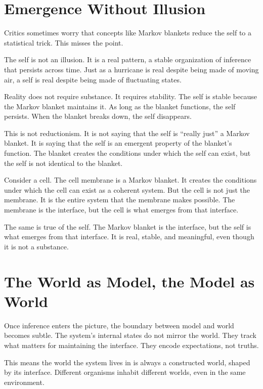 \documentclass[
  openright]{book}
\begin{document}
\section{Emergence Without Illusion}\label{emergence-without-illusion}

Critics sometimes worry that concepts like Markov blankets reduce the
self to a statistical trick. This misses the point.

The self is not an illusion. It is a real pattern, a stable organization
of inference that persists across time. Just as a hurricane is real
despite being made of moving air, a self is real despite being made of
fluctuating states.

Reality does not require substance. It requires stability. The self is
stable because the Markov blanket maintains it. As long as the blanket
functions, the self persists. When the blanket breaks down, the self
disappears.

This is not reductionism. It is not saying that the self is ``really
just'' a Markov blanket. It is saying that the self is an emergent
property of the blanket's function. The blanket creates the conditions
under which the self can exist, but the self is not identical to the
blanket.

Consider a cell. The cell membrane is a Markov blanket. It creates the
conditions under which the cell can exist as a coherent system. But the
cell is not just the membrane. It is the entire system that the membrane
makes possible. The membrane is the interface, but the cell is what
emerges from that interface.

The same is true of the self. The Markov blanket is the interface, but
the self is what emerges from that interface. It is real, stable, and
meaningful, even though it is not a substance.

\section{The World as Model, the Model as
World}\label{the-world-as-model-the-model-as-world}

Once inference enters the picture, the boundary between model and world
becomes subtle. The system's internal states do not mirror the world.
They track what matters for maintaining the interface. They encode
expectations, not truths.

This means the world the system lives in is always a constructed world,
shaped by its interface. Different organisms inhabit different worlds,
even in the same environment.
\end{document}
